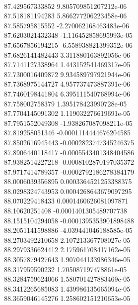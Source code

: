 { \\
87.429567333852 9.805709851207212e-06
 \\
87.518181194283 5.866277206223458e-06
 \\
87.585795815552 -2.270062168463483e-06
 \\
87.6203021432348 -1.116452858695993e-05
 \\
87.6567856194215 -6.558938821399352e-06
 \\
87.6826141482443 3.311880163892056e-06
 \\
87.7141127338964 1.443152541469317e-05
 \\
87.7300016409872 9.934589797921944e-06
 \\
87.7368975144727 4.957737473887391e-06
 \\
87.7460198441804 6.395111540768994e-06
 \\
87.758002758379 1.395178423990728e-05
 \\
87.7704145091302 1.119032276619691e-05
 \\
87.7951552049308 -1.938267087098211e-05
 \\
87.819258051346 -0.0001114444676204585
 \\
87.8502616945443 -0.0002823747345246375
 \\
87.8906440118417 -0.0005543401348404586
 \\
87.9382514227218 -0.0008102870197035372
 \\
87.9717414789357 -0.0002792186278384179
 \\
88.0006039356895 0.0003364521253388375
 \\
88.0298324743953 0.0004268643679097295
 \\
88.070229418433 0.0001460626081097871
 \\
88.10620251408 -0.0001401305489707738
 \\
88.1515104294058 -0.0001395353901898488
 \\
88.2051141598886 -4.039441046188585e-05
 \\
88.2703492210658 2.107213367708027e-05
 \\
88.2979336624412 2.175961708417162e-05
 \\
88.3057879427643 1.907044133986346e-05
 \\
88.317959590232 1.705087197478861e-05
 \\
88.3284759624066 1.580701427883469e-05
 \\
88.3412265685083 1.439986135665094e-05
 \\
88.3659046145276 1.258602151210653e-05
 \\
}
